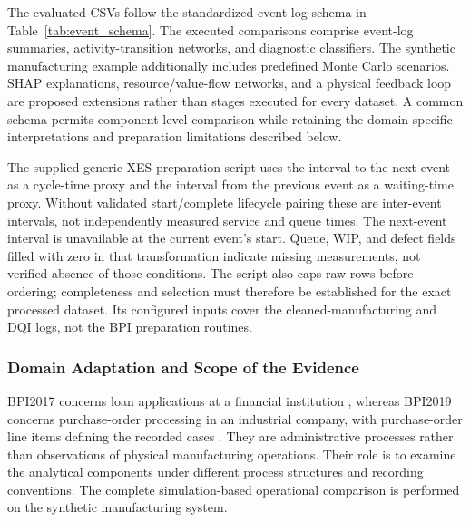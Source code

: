 \documentclass[pdflatex,iicol,Numbered,sn-basic]{sn-jnl}
\begin{document}
The evaluated CSVs follow the standardized event-log schema in Table~\ref{tab:event_schema}. The executed comparisons comprise event-log summaries, activity-transition networks, and diagnostic classifiers. The synthetic manufacturing example additionally includes predefined Monte Carlo scenarios. SHAP explanations, resource/value-flow networks, and a physical feedback loop are proposed extensions rather than stages executed for every dataset. A common schema permits component-level comparison while retaining the domain-specific interpretations and preparation limitations described below.

The supplied generic XES preparation script uses the interval to the next event as a cycle-time proxy and the interval from the previous event as a waiting-time proxy. Without validated start/complete lifecycle pairing these are inter-event intervals, not independently measured service and queue times. The next-event interval is unavailable at the current event's start. Queue, WIP, and defect fields filled with zero in that transformation indicate missing measurements, not verified absence of those conditions. The script also caps raw rows before ordering; completeness and selection must therefore be established for the exact processed dataset. Its configured inputs cover the cleaned-manufacturing and DQI logs, not the BPI preparation routines.

\subsubsection{Domain Adaptation and Scope of the Evidence}
\label{subsec:domain_adaptation}

BPI2017 concerns loan applications at a financial institution \cite{BPI2017Dataset}, whereas BPI2019 concerns purchase-order processing in an industrial company, with purchase-order line items defining the recorded cases \cite{BPI2019Dataset}. They are administrative processes rather than observations of physical manufacturing operations. Their role is to examine the analytical components under different process structures and recording conventions. The complete simulation-based operational comparison is performed on the synthetic manufacturing system.
\end{document}
